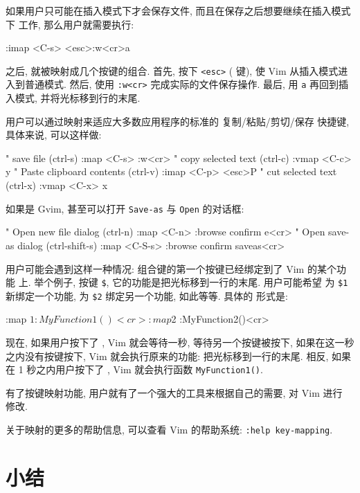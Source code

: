如果用户只可能在插入模式下才会保存文件, 而且在保存之后想要继续在插入模式下
工作, 那么用户就需要执行:
\begin{vimcmd}
:imap <C-s> <esc>:w<cr>a
\end{vimcmd}

之后,  就被映射成几个按键的组合. 首先, 按下 \texttt{<esc>}
( 键), 使 Vim 从插入模式进入到普通模式. 然后, 使用 
\texttt{:w<cr>} 完成实际的文件保存操作. 最后, 用 \texttt{a} 再回到插入模式,
并将光标移到行的末尾.

用户可以通过映射来适应大多数应用程序的标准的 复制/粘贴/剪切/保存 快捷键,
具体来说, 可以这样做:
\begin{vimscript}
" save file (ctrl-s)
:map <C-s> :w<cr>
" copy selected text (ctrl-c)
:vmap <C-c> y
" Paste clipboard contents (ctrl-v)
:imap <C-p> <esc>P
" cut selected text (ctrl-x)
:vmap <C-x> x
\end{vimscript}

如果是 Gvim, 甚至可以打开 \texttt{Save-as} 与 \texttt{Open} 的对话框:
\begin{vimscript}
" Open new file dialog (ctrl-n)
:map <C-n> :browse confirm e<cr>
" Open save-as dialog (ctrl-shift-s)
:map <C-S-s> :browse confirm saveas<cr>
\end{vimscript}

用户可能会遇到这样一种情况: 组合键的第一个按键已经绑定到了 Vim 的某个功能
上. 举个例子, 按键 \verb'$', 它的功能是把光标移到一行的末尾. 用户可能希望 
为 \verb'$1' 新绑定一个功能, 为 \verb'$2' 绑定另一个功能, 如此等等. 具体的 
形式是:
\begin{vimscript}
:map $1 :MyFunction1()<cr>
:map $2 :MyFunction2()<cr>
\end{vimscript}

现在, 如果用户按下了 \key{\$}, Vim 就会等待一秒, 等待另一个按键被按下, 
如果在这一秒之内没有按键按下, Vim 就会执行原来的功能: 把光标移到一行的末尾.
相反, 如果在 1 秒之内用户按下了 , Vim 就会执行函数
\texttt{MyFunction1()}.

有了按键映射功能, 用户就有了一个强大的工具来根据自己的需要, 对 Vim 进行 
修改.

\begin{tips}
    关于映射的更多的帮助信息, 可以查看 Vim 的帮助系统: \texttt{:help
    key-mapping}.
\end{tips}
\section{小结}
\label{sec:personalizing_vim_summary}

